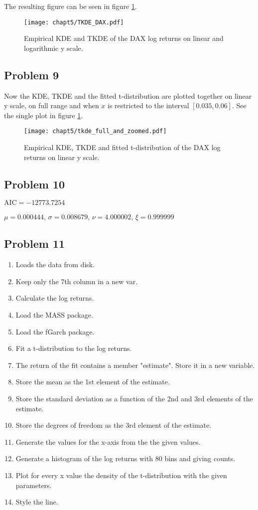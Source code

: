 \documentclass{article}
\begin{document}
The resulting figure can be seen in figure \ref{fig:TKDE_DAX}.
\begin{figure}[ht]
    \centering
    \texttt{[image: chapt5/TKDE\_DAX.pdf]}
    \caption{Empirical KDE and TKDE of the DAX log returns on linear and logarithmic y scale.}
    \label{fig:TKDE_DAX}
\end{figure}

\subsection{Problem 9}
Now the KDE, TKDE and the fitted t-distribution are plotted together on linear y scale,
on full range and when $x$ is restricted to the interval $[0.035, 0.06]$.
See the single plot in figure \ref{fig:TKDE_DAX}.

\begin{figure}[ht]
    \centering
    \texttt{[image: chapt5/tkde\_full\_and\_zoomed.pdf]}
    \caption{Empirical KDE, TKDE and fitted t-distribution of the DAX log returns on linear y scale.}
    \label{fig:TKDE_DAX_full}
\end{figure}
\subsection{Problem 10}
$\text{AIC}= -12773.7254$

$\mu = 0.000444$, $\sigma = 0.008679$, $\nu = 4.000002$, $\xi = 0.999999$
\subsection{Problem 11}
\begin{enumerate}
    \item Loads the data from disk.
    \item Keep only the 7th column in a new var.
    \item Calculate the log returns.
    \item Load the MASS package.
    \item Load the fGarch package.
    \item Fit a t-distribution to the log returns.
    \item The return of the fit contains a member "estimate". Store it in a new variable.
    \item Store the mean as the 1st element of the estimate.
    \item Store the standard deviation as a function of the 2nd and 3rd elements of the estimate.
    \item Store the degrees of freedom as the 3rd element of the estimate.
    \item Generate the values for the x-axis from the the given values.
    \item Generate a histogram of the log returns with 80 bins and giving counts.
    \item Plot for every x value the density of the t-distribution with the given parameters.
    \item Style the line.
\end{enumerate}
\end{document}
